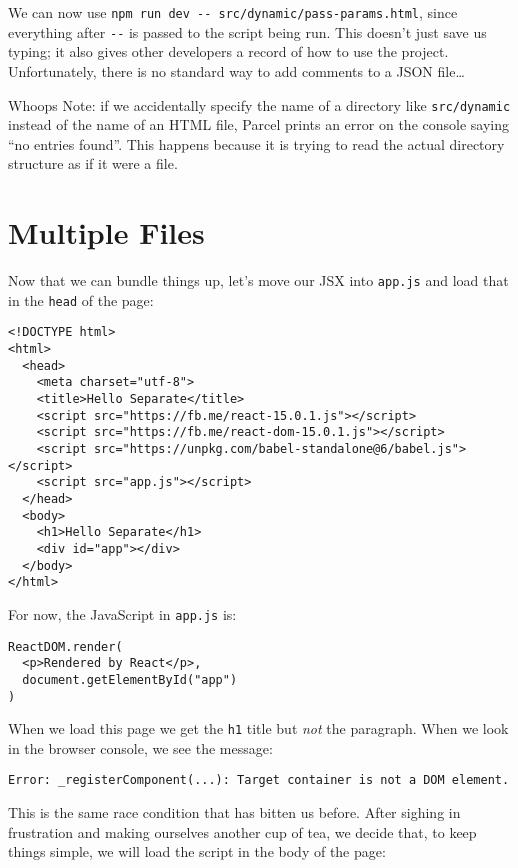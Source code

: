 We can now use \texttt{npm\ run\ dev\ -\/-\ src/dynamic/pass-params.html},
since everything after \texttt{-\/-} is passed to the script being run.
This doesn't just save us typing;
it also gives other developers a record of how to use the project.
Unfortunately,
there is no standard way to add comments to a JSON file{\ldots}

\begin{aside}{Whoops}
  Note:
  if we accidentally specify the name of a directory like \texttt{src/dynamic}
  instead of the name of an HTML file,
  Parcel prints an error on the console saying ``no entries found''.
  This happens because it is trying to read the actual directory structure
  as if it were a file.
\end{aside}

\section{Multiple Files}\label{s:dynamic-multiple}

Now that we can bundle things up,
let's move our JSX into \texttt{app.js} and load that in the \texttt{head} of the page:

\begin{verbatim}
<!DOCTYPE html>
<html>
  <head>
    <meta charset="utf-8">
    <title>Hello Separate</title>
    <script src="https://fb.me/react-15.0.1.js"></script>
    <script src="https://fb.me/react-dom-15.0.1.js"></script>
    <script src="https://unpkg.com/babel-standalone@6/babel.js"></script>
    <script src="app.js"></script>
  </head>
  <body>
    <h1>Hello Separate</h1>
    <div id="app"></div>
  </body>
</html>
\end{verbatim}

For now,
the JavaScript in \texttt{app.js} is:

\begin{verbatim}
ReactDOM.render(
  <p>Rendered by React</p>,
  document.getElementById("app")
)
\end{verbatim}

When we load this page we get the \texttt{h1} title but \emph{not} the paragraph.
When we look in the browser console,
we see the message:

\begin{verbatim}
Error: _registerComponent(...): Target container is not a DOM element.
\end{verbatim}

This is the same race condition that has bitten us before.
After sighing in frustration and making ourselves another cup of tea,
we decide that,
to keep things simple,
we will load the script in the body of the page:

